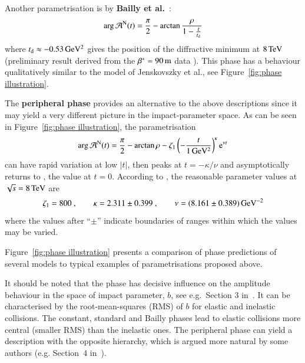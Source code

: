 Another parametrisation is by {\bf Bailly et al.}~\cite{bailly87}:
\begin{equation}
\label{eq:nuc phase bai}
	\arg {\cal A}^{\rm N}(t) = {\pi\over 2} - \arctan {\rho\over 1 - {t\over t_{\rm d}}}
\end{equation}
where $t_{\rm d} \approx -0.53\,{\rm GeV^2}$ gives the position of the diffractive minimum at $8\,{\rm TeV}$ (preliminary result derived from the $\beta^* = 90\,{\rm m}$ data \cite{8tev-90m}). This phase has a behaviour qualitatively similar to the model of Jenskovszky et al., see Figure~\ref{fig:phase illustration}.

The {\bf peripheral phase} \cite{kl94} provides an alternative to the above descriptions since it may yield a very different picture in the impact-parameter space. As can be seen in Figure~\ref{fig:phase illustration}, the parametrisation
\begin{equation}
\label{eq:nuc phase per}
\arg {\cal A}^{\rm N}(t) = {\pi\over 2} - \arctan\rho - \zeta_1 \left(- {t\over 1\un{GeV^2}} \right)^\kappa \e^{\nu t}
\end{equation}
can have rapid variation at low $|t|$, then peaks at $t = -\kappa / \nu$ and asymptotically returns to , the value at $t=0$. According to \cite{kl-8tev}, the reasonable parameter values at $\sqrt s = 8\,{\rm TeV}$ are
\begin{equation}
\label{eq:nuc phase per val}
	\zeta_1 = 800\ ,\qquad
	\kappa = 2.311 \pm 0.399\ ,\qquad
	\nu = (8.161 \pm 0.389)\,{\rm GeV^{-2}}
\end{equation}
where the values after ``$\pm$'' indicate boundaries of ranges within which the values may be varied.


Figure~\ref{fig:phase illustration} presents a comparison of phase predictions of several models to typical examples of parametrisations proposed above.

  It should be noted that the phase has decisive influence on the amplitude behaviour in the space of impact parameter, $b$, see e.g.~Section 3 in~\cite{klk02}. It can be characterised by the root-mean-squares (RMS) of $b$ for elastic and inelastic collisions. The constant, standard and Bailly phases lead to elastic collisions more central (smaller RMS) than the inelastic ones. The peripheral phase can yield a description with the opposite hierarchy, which is argued more natural by some authors (e.g. Section~4 in~\cite{kl96}).

